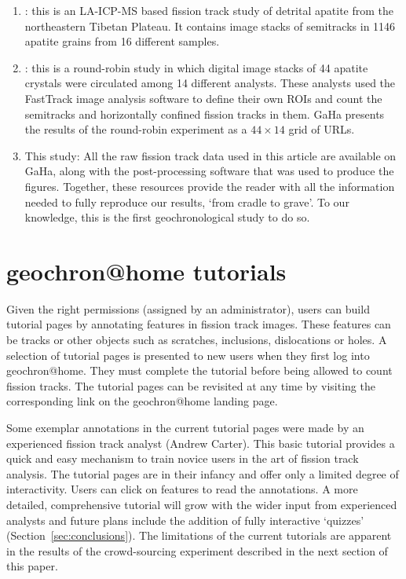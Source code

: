 \documentclass[gchron, manuscript]{copernicus}
\begin{document}
\begin{enumerate}
\item{\citet{guo2025}}: this is an LA-ICP-MS based fission track study
  of detrital apatite from the northeastern Tibetan Plateau. It
  contains image stacks of semitracks in 1146 apatite grains from 16
  different samples.
\item{\citet{tamer2025}}: this is a round-robin study in which digital
  image stacks of 44 apatite crystals were circulated among 14
  different analysts. These analysts used the FastTrack image analysis
  software \citep[which is part of the Fission Track Studio
    suite;][]{gleadow2009} to define their own ROIs and count the
  semitracks and horizontally confined fission tracks in them. GaHa
  presents the results of the round-robin experiment as a
  ${44}\times{14}$ grid of URLs.
\item{This study}: All the raw fission track data used in this article
  are available on GaHa, along with the post-processing software that
  was used to produce the figures. Together, these resources provide
  the reader with all the information needed to fully reproduce our
  results, `from cradle to grave'. To our knowledge, this is the first
  geochronological study to do so.
\end{enumerate}

\section{geochron@home tutorials}\label{sec:tutorial}

Given the right permissions (assigned by an administrator), users can
build tutorial pages by annotating features in fission track images.
These features can be tracks or other objects such as scratches,
inclusions, dislocations or holes. A selection of tutorial pages is
presented to new users when they first log into
geochron@home. They must complete the tutorial before being
allowed to count fission tracks.  The tutorial pages can be revisited
at any time by visiting the corresponding link on the
geochron@home landing page.\medskip

Some exemplar annotations in the current tutorial pages were made by
an experienced fission track analyst (Andrew Carter). This basic
tutorial provides a quick and easy mechanism to train novice users in
the art of fission track analysis. The tutorial pages are in their
infancy and offer only a limited degree of interactivity. Users can
click on features to read the annotations. A more detailed,
comprehensive tutorial will grow with the wider input from experienced
analysts and future plans include the addition of fully interactive
`quizzes' (Section~\ref{sec:conclusions}). The limitations of the
current tutorials are apparent in the results of the crowd-sourcing
experiment described in the next section of this paper.
\end{document}
